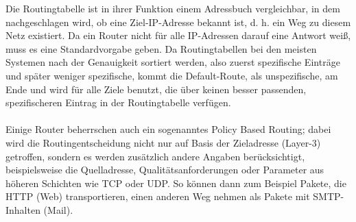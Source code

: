 Die Routingtabelle ist in ihrer Funktion einem Adressbuch vergleichbar, in dem nachgeschlagen wird, ob eine Ziel-IP-Adresse bekannt ist, d. h. ein Weg zu diesem Netz existiert. Da ein Router nicht für alle IP-Adressen darauf eine Antwort weiß, muss es eine Standardvorgabe geben. Da Routingtabellen bei den meisten Systemen nach der Genauigkeit sortiert werden, also zuerst spezifische Einträge und später weniger spezifische, kommt die Default-Route, als unspezifische, am Ende und wird für alle Ziele benutzt, die über keinen besser passenden, spezifischeren Eintrag in der Routingtabelle verfügen.\\\\

Einige Router beherrschen auch ein sogenanntes Policy Based Routing; dabei wird die Routingentscheidung nicht nur auf Basis der Zieladresse (Layer-3) getroffen, sondern es werden zusätzlich andere Angaben berücksichtigt, beispielsweise die Quelladresse, Qualitätsanforderungen oder Parameter aus höheren Schichten wie TCP oder UDP. So können dann zum Beispiel Pakete, die HTTP (Web) transportieren, einen anderen Weg nehmen als Pakete mit SMTP-Inhalten (Mail).
